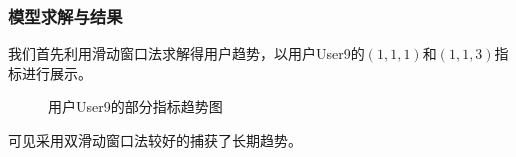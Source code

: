\documentclass{my_paper}
\begin{document}
\subsubsection{模型求解与结果}
我们首先利用滑动窗口法求解得用户趋势，以用户User9的$(1,1,1)$和$(1,1,3)$指标进行展示。
\begin{figure}[htbp]
    \centering  %
    

    \caption{用户User9的部分指标趋势图}    %
    \label{fig:1}    %
\end{figure}
可见采用双滑动窗口法较好的捕获了长期趋势。
\end{document}
